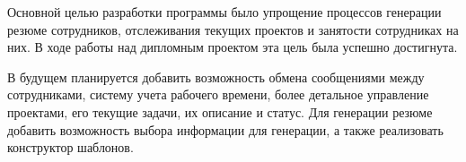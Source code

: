 Основной целью разработки программы было упрощение процессов генерации резюме сотрудников, отслеживания текущих проектов
и занятости сотрудниках на них. В ходе работы над дипломным проектом эта цель была успешно достигнута.

В будущем планируется добавить возможность обмена сообщениями между сотрудниками, систему учета рабочего времени,
более детальное \linebreak управление проектами, его текущие задачи, их описание и статус. Для генерации резюме добавить возможность
выбора информации для генерации, а также реализовать конструктор шаблонов.

